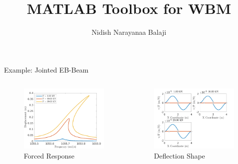\documentclass{beamertmd}
\title{MATLAB Toolbox for WBM}
\author{Nidish Narayanaa Balaji}
\begin{document}
\maketitle

\begin{frame}{Example: Jointed EB-Beam}  
  \begin{columns}
    \begin{column}{.5\textwidth}
      \begin{figure}
        \centering
        \includegraphics[width=\linewidth]{FIGS/fresp_EBBEAMJ}
        \caption{Forced Response}
      \end{figure}
    \end{column}

    \begin{column}{.5\textwidth}
      \begin{figure}
        \centering
        \includegraphics[width=\linewidth]{FIGS/dshape_EBBEAMJ}
        \caption{Deflection Shape}
      \end{figure}
    \end{column}
  \end{columns}
\end{frame}
\end{document}
